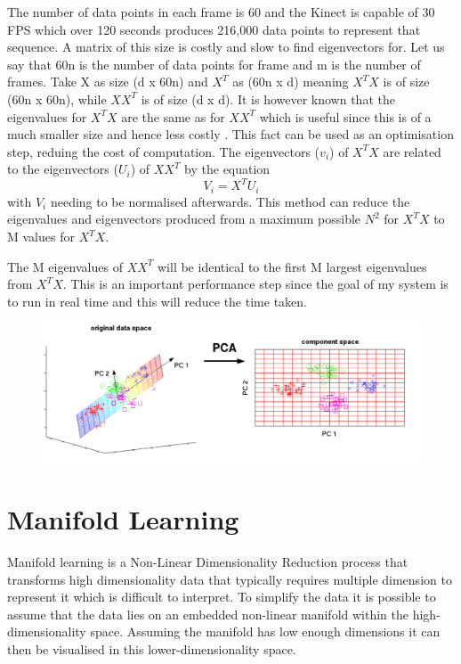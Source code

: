 The number of data points in each frame is 60 and the Kinect is capable of 30 FPS which over 120 seconds produces 216,000 data points to represent that sequence. A matrix of this size is costly and slow to find eigenvectors for. Let us say that 60n is the number of data points for frame and m is the number of frames. Take X as size (d x 60n) and $X^T$ as (60n x d) meaning $X^TX$ is of size (60n x 60n), while $XX^T$ is of size (d x d). It is however known that the eigenvalues for $X^TX$ are the same as for $XX^T$ which is useful since this is of a much smaller size and hence less costly \cite{fastPCA}. This fact can be used as an optimisation step, reduing the cost of computation.
The eigenvectors ($v_i$) of $X^TX$ are related to the eigenvectors ($U_i$) of $XX^T$ by the equation $$V_i = X^TU_i$$ with $V_i$ needing to be normalised afterwards. This method can reduce the eigenvalues and eigenvectors produced from a maximum possible $N^2$ for $X^TX$ to M values for $X^TX$.

The M eigenvalues of $XX^T$ will be identical to the first M largest eigenvalues from $X^TX$. This is an important performance step since the goal of my system is to run in real time and this will reduce the time taken.

\begin{figure}[h]
    \centering
    \includegraphics[height=0.25\textheight]{fig02/PCA.pdf}
\end{figure}


\section{Manifold Learning}
Manifold learning is a Non-Linear Dimensionality Reduction process that transforms high dimensionality data that typically requires multiple dimension to represent it which is difficult to interpret. To simplify the data it is possible to assume that the data lies on an embedded non-linear manifold within the high-dimensionality space. Assuming the manifold has low enough dimensions it can then be visualised in this lower-dimensionality space.

